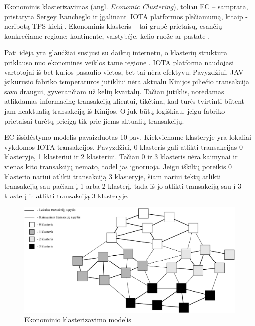 

Ekonominis klasterizavimas (angl. \textit{Economic Clustering}), toliau EC – samprata, pristatyta Sergey Ivancheglo ir įgalinanti IOTA platformos plečiamumą, kitaip - neribotą TPS kiekį \cite{sergey2018economic}.
Ekonominis klasteris – tai grupė prietaisų, esančių konkrečiame regione: kontinente, valstybėje, kelio ruože ar pastate \cite{sergey2018economic}. 

Pati idėja yra glaudžiai susijusi su daiktų internetu, o klasterių struktūra priklauso nuo ekonominės veiklos tame regione \cite{sergey2018economic}. IOTA platforma naudojasi vartotojai iš bet kurios pasaulio vietos, bet tai nėra efektyvu. Pavyzdžiui, JAV įsikūrusio fabriko temperatūros jutikliui nėra aktualu Kinijos piliečio transakcija savo draugui, gyvenančiam už kelių kvartalų. Tačiau jutiklis, norėdamas atlikdamas informacinę transakciją klientui, tikėtina, kad turės tvirtinti būtent jam neaktualią transakciją iš Kinijos. O juk būtų logiškiau, jeigu fabriko prietaisai turėtų prieigą tik prie jiems aktualių transakcijų.

EC išsidėstymo modelis pavaizduotas 10 pav. Kiekviename klasteryje yra lokaliai vykdomos IOTA transakcijos. Pavyzdžiui, 0 klasteris gali atlikti transakcijas 0 klasteryje, 1 klasteriui ir 2 klasteriui. Tačiau 0 ir 3 klasteris nėra kaimynai ir vienas kito transakcijų nemato, todėl jas ignoruoja. Jeigu iškiltų poreikis 0 klasterio nariui atlikti transakciją 3 klasteryje, šiam nariui tektų atlikti transakciją sau pačiam į 1 arba 2 klasterį, tada iš jo atlikti transakciją sau į 3 klasterį ir atlikti transakciją 3 klasteryje.

\begin{figure}[H]
    \centering
    \includegraphics[scale=0.7]{images/economic-clusters}
    \caption{Ekonominio klasterizavimo modelis}
\end{figure}

